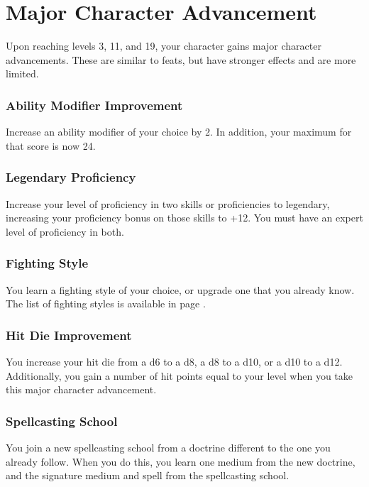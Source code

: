 \section{Major Character Advancement} \label{sec::majorcharacteradvancement}
Upon reaching levels 3, 11, and 19, your character gains major character advancements.
These are similar to feats, but have stronger effects and are more limited.

\subsubsection{Ability Modifier Improvement} \label{mca::abilitymodifierimprovement}
    Increase an ability modifier of your choice by 2.
    In addition, your maximum for that score is now 24.

\subsubsection{Legendary Proficiency} \label{mca::legendaryproficiency}
    Increase your level of proficiency in two skills or proficiencies to legendary, increasing your proficiency bonus on those skills to +12.
    You must have an expert level of proficiency in both.

\subsubsection{Fighting Style} \label{mca::fightingstyle}
    You learn a fighting style of your choice, or upgrade one that you already know.
    The list of fighting styles is available in page \pageref{ssec::fightingstyles}.

\subsubsection{Hit Die Improvement} \label{mca::hitdieimprovement}
    You increase your hit die from a d6 to a d8, a d8 to a d10, or a d10 to a d12.
    Additionally, you gain a number of hit points equal to your level when you take this major character advancement.

\subsubsection{Spellcasting School} \label{mca::spellcastingschool}
    You join a new spellcasting school from a doctrine different to the one you already follow.
    When you do this, you learn one medium from the new doctrine, and the signature medium and spell from the spellcasting school.


